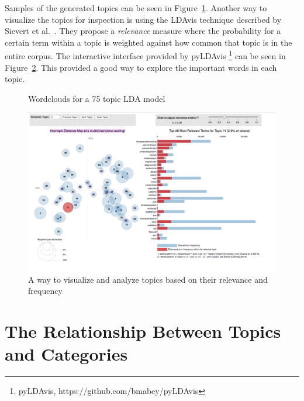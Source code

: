 Samples of the generated topics can be seen in Figure~\ref{fig:topic-wordclouds}.
Another way to visualize the topics for inspection is using the LDAvis technique described by Sievert et al\@.~\cite{sievert2014ldavis}.
They propose a \textit{relevance} measure where the probability for a certain term within a topic is weighted against how common that topic is in the entire corpus.
The interactive interface provided by pyLDAvis \footnote{pyLDAvis, https://github.com/bmabey/pyLDAvis}  can be seen in Figure~\ref{fig:ldavis-sample}.
This provided a good way to explore the important words in each topic.

\begin{figure}
    \centering
    \caption{Wordclouds for a 75 topic LDA model}
    \label{fig:topic-wordclouds}
\end{figure}

\begin{figure}
    \centering
    \includegraphics[width=\textwidth]{figures/ldavis-sample.png}
    \caption{A way to visualize and analyze topics based on their relevance and frequency}
    \label{fig:ldavis-sample}
\end{figure}

\section{The Relationship Between Topics and Categories}
\label{sec:topic-categories}

